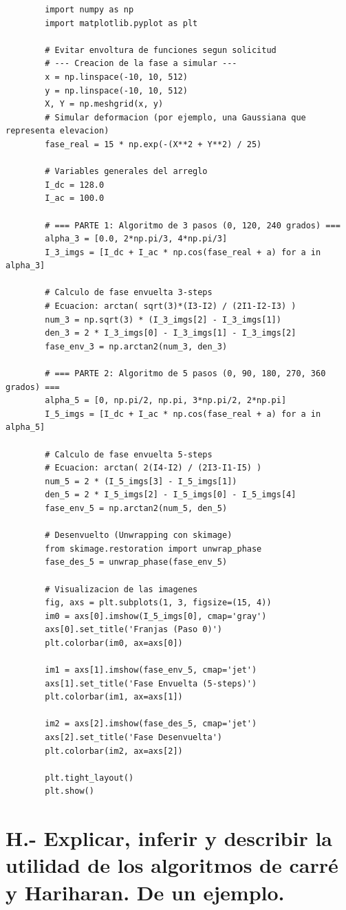 \documentclass[12pt,letterpaper]{article}
\begin{document}
	
	\begin{lstlisting}
		import numpy as np
		import matplotlib.pyplot as plt
		
		# Evitar envoltura de funciones segun solicitud
		# --- Creacion de la fase a simular ---
		x = np.linspace(-10, 10, 512)
		y = np.linspace(-10, 10, 512)
		X, Y = np.meshgrid(x, y)
		# Simular deformacion (por ejemplo, una Gaussiana que representa elevacion)
		fase_real = 15 * np.exp(-(X**2 + Y**2) / 25)
		
		# Variables generales del arreglo
		I_dc = 128.0
		I_ac = 100.0
		
		# === PARTE 1: Algoritmo de 3 pasos (0, 120, 240 grados) ===
		alpha_3 = [0.0, 2*np.pi/3, 4*np.pi/3]
		I_3_imgs = [I_dc + I_ac * np.cos(fase_real + a) for a in alpha_3]
		
		# Calculo de fase envuelta 3-steps
		# Ecuacion: arctan( sqrt(3)*(I3-I2) / (2I1-I2-I3) )
		num_3 = np.sqrt(3) * (I_3_imgs[2] - I_3_imgs[1])
		den_3 = 2 * I_3_imgs[0] - I_3_imgs[1] - I_3_imgs[2]
		fase_env_3 = np.arctan2(num_3, den_3)
		
		# === PARTE 2: Algoritmo de 5 pasos (0, 90, 180, 270, 360 grados) ===
		alpha_5 = [0, np.pi/2, np.pi, 3*np.pi/2, 2*np.pi]
		I_5_imgs = [I_dc + I_ac * np.cos(fase_real + a) for a in alpha_5]
		
		# Calculo de fase envuelta 5-steps
		# Ecuacion: arctan( 2(I4-I2) / (2I3-I1-I5) )
		num_5 = 2 * (I_5_imgs[3] - I_5_imgs[1])
		den_5 = 2 * I_5_imgs[2] - I_5_imgs[0] - I_5_imgs[4]
		fase_env_5 = np.arctan2(num_5, den_5)
		
		# Desenvuelto (Unwrapping con skimage)
		from skimage.restoration import unwrap_phase
		fase_des_5 = unwrap_phase(fase_env_5)
		
		# Visualizacion de las imagenes
		fig, axs = plt.subplots(1, 3, figsize=(15, 4))
		im0 = axs[0].imshow(I_5_imgs[0], cmap='gray')
		axs[0].set_title('Franjas (Paso 0)')
		plt.colorbar(im0, ax=axs[0])
		
		im1 = axs[1].imshow(fase_env_5, cmap='jet')
		axs[1].set_title('Fase Envuelta (5-steps)')
		plt.colorbar(im1, ax=axs[1])
		
		im2 = axs[2].imshow(fase_des_5, cmap='jet')
		axs[2].set_title('Fase Desenvuelta')
		plt.colorbar(im2, ax=axs[2])
		
		plt.tight_layout()
		plt.show()
	\end{lstlisting}
	
	\vspace{0.8cm}
	\section*{H.- Explicar, inferir y describir la utilidad de los algoritmos de carré y Hariharan. De un ejemplo.}
	
\end{document}
